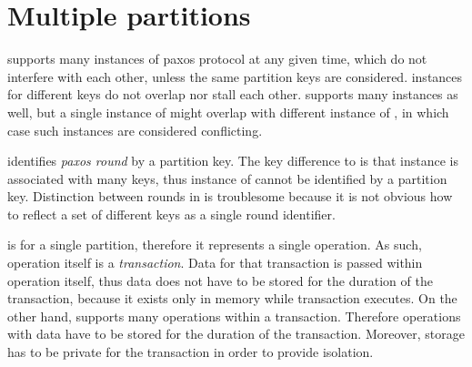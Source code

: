 
\section{Multiple partitions}\label{sec:mpp:requirements}


\lwt supports many instances of paxos protocol at any given time, which do not interfere with each other, unless the same partition keys are considered. \lwt instances for different keys do not overlap nor stall each other.
\mpt supports many instances as well, but a single instance of \mpt might overlap with different instance of \mpt, in which case such instances are considered conflicting. 

\lwt identifies \emph{paxos round} by a partition key. The key difference to \lwt is that \mpt instance is associated with many keys, thus instance of \mpt cannot be identified by a partition key. 
Distinction between \paxos rounds in \mpt is troublesome because it is not obvious how to reflect a set of different keys as a single round identifier.
\label{sec:mpp:requirements:identifyRound}

\lwt is for a single partition, therefore it represents a single operation. As such, operation itself is a \emph{transaction}. Data for that transaction is passed within operation itself, thus data does not have to be stored for the duration of the transaction, because it exists only in memory while \lwt transaction executes. 
On the other hand, \mpt supports many operations within a transaction. Therefore operations with data have to be stored for the duration of the transaction. Moreover, storage has to be private for the transaction in order to provide isolation.



